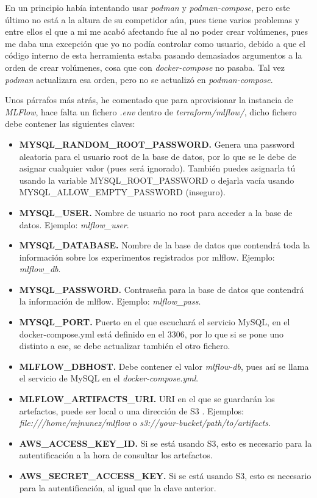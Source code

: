 En un principio había intentando usar \textit{podman} y \textit{podman-compose}, pero este último no está a la altura de su competidor aún, pues tiene varios problemas y entre ellos el que a mi me acabó afectando fue al no poder crear volúmenes, pues me daba una excepción que yo no podía controlar como usuario, debido a que el código interno de esta herramienta estaba pasando demasiados argumentos a la orden de crear volúmenes, cosa que con \textit{docker-compose} no pasaba. Tal vez \textit{podman} actualizara esa orden, pero no se actualizó en \textit{podman-compose}.\newline

Unos párrafos más atrás, he comentado que para aprovisionar la instancia de \textit{MLFlow}, hace falta un fichero \textit{.env} dentro de \textit{terraform/mlflow/}, dicho fichero debe contener las siguientes claves:

\begin{itemize}
	\item \textbf{MYSQL\_RANDOM\_ROOT\_PASSWORD.} Genera una password aleatoria para el usuario root de la base de datos, por lo que se le debe de asignar cualquier valor (pues será ignorado). También puedes asignarla tú usando la variable MYSQL\_ROOT\_PASSWORD o dejarla vacía usando MYSQL\_ALLOW\_EMPTY\_PASSWORD (inseguro).
	\item \textbf{MYSQL\_USER.} Nombre de usuario no root para acceder a la base de datos. Ejemplo: \textit{mlflow\_user}.
	\item \textbf{MYSQL\_DATABASE.} Nombre de la base de datos que contendrá toda la información sobre los experimentos registrados por mlflow. Ejemplo: \textit{mlflow\_db}.
	\item \textbf{MYSQL\_PASSWORD.} Contraseña para la base de datos que contendrá la información de mlflow. Ejemplo: \textit{mlflow\_pass}.
	\item \textbf{MYSQL\_PORT.} Puerto en el que escuchará el servicio MySQL, en el docker-compose.yml está definido en el 3306, por lo que si se pone uno distinto a ese, se debe actualizar también el otro fichero.
	\item \textbf{MLFLOW\_DBHOST.} Debe contener el valor \textit{mlflow-db}, pues así se llama el servicio de MySQL en el \textit{docker-compose.yml}.
	\item \textbf{MLFLOW\_ARTIFACTS\_URI.} URI en el que se guardarán los artefactos, puede ser local o una dirección de S3 \cite{mlflowtracking}. Ejemplos: \textit{file:///home/mjnunez/mlflow} o \textit{s3://your-bucket/path/to/artifacts}.
	\item \textbf{AWS\_ACCESS\_KEY\_ID.} Si se está usando S3, esto es necesario para la autentificación a la hora de consultar los artefactos.
	\item \textbf{AWS\_SECRET\_ACCESS\_KEY.} Si se está usando S3, esto es necesario para la autentificación, al igual que la clave anterior.
\end{itemize}

